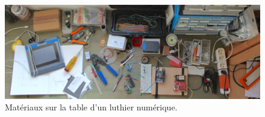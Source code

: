 \begin{figure}[!htbp]
	\captionsetup{format=plain}%
	\includegraphics[width=\textwidth]{gfx/05_interfaces/lutherie-worktable.jpg}
	\caption[Matériaux sur la table d'un luthier numérique]{Matériaux sur la table d'un luthier numérique.}
	\label{fig:interface:table-luthier}
\end{figure}

